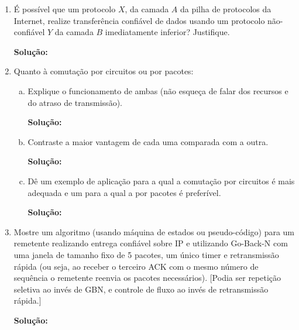 \documentclass{article}
\begin{document}
\begin{enumerate}
\item É possível que um protocolo $X$, da camada $A$ da pilha de protocolos da Internet, realize transferência confiável de dados usando um protocolo não-confiável $Y$ da camada $B$ imediatamente inferior? Justifique.
\begin{addmargin}[0.5in]{0.5in}
\par \textbf{Solução:}
\end{addmargin}

\item Quanto à comutação por circuitos ou por pacotes:
\begin{enumerate}[a)]
\item Explique o funcionamento de ambas (não esqueça de falar dos recursos e do atraso de transmissão).
\begin{addmargin}[0.5in]{0.5in}
\par \textbf{Solução:}
\end{addmargin}

\item Contraste a maior vantagem de cada uma comparada com a outra.
\begin{addmargin}[0.5in]{0.5in}
\par \textbf{Solução:}
\end{addmargin}

\item Dê um exemplo de aplicação para a qual a comutação por circuitos é mais adequada e um para a qual a por pacotes é preferível.
\begin{addmargin}[0.5in]{0.5in}
\par \textbf{Solução:}
\end{addmargin}

\end{enumerate}

\item Mostre um algoritmo (usando máquina de estados ou pseudo-código) para um remetente realizando entrega confiável sobre IP e utilizando Go-Back-N com uma janela de tamanho fixo de 5 pacotes, um único timer e retransmissão rápida (ou seja, ao receber o terceiro ACK com o mesmo número de sequência o remetente reenvia os pacotes necessários). [Podia ser repetição seletiva ao invés de GBN, e controle de fluxo ao invés de retransmissão rápida.]
\begin{addmargin}[0.5in]{0.5in}
\par \textbf{Solução:}
\end{addmargin}


\end{enumerate}
\end{document}
